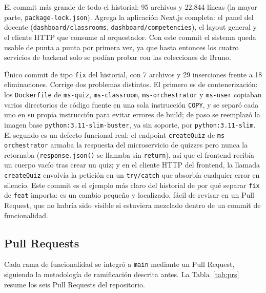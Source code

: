 \documentclass[12pt,a4paper]{article}
\begin{document}
\begin{description}[leftmargin=0pt,style=nextline,itemsep=8pt]
  \item[\texttt{9efe0b5} --- \texttt{feat(frontend): add web application and core features}]
  El commit más grande de todo el historial: 95 archivos y 22{,}844 líneas (la mayor parte,
  \texttt{package-lock.json}). Agrega la aplicación Next.js completa: el panel del docente
  (\texttt{dashboard/classrooms}, \texttt{dashboard/competencies}), el layout general y el cliente
  HTTP que consume al orquestador. Con este commit el sistema queda usable de punta a punta por
  primera vez, ya que hasta entonces los cuatro servicios de backend solo se podían probar con las
  colecciones de Bruno.

  \item[\texttt{3a3222b} --- \texttt{fix: stabilize service containers and return created quizzes}]
  Único commit de tipo \texttt{fix} del historial, con 7 archivos y 29 inserciones frente a 18
  eliminaciones. Corrige dos problemas distintos. El primero es de contenerización: los
  \texttt{Dockerfile} de \texttt{ms-quiz}, \texttt{ms-classroom}, \texttt{ms-orchestrator} y
  \texttt{ms-user} copiaban varios directorios de código fuente en una sola instrucción
  \texttt{COPY}, y se separó cada uno en su propia instrucción para evitar errores de build; de
  paso se reemplazó la imagen base \texttt{python:3.11-slim-buster}, ya sin soporte, por
  \texttt{python:3.11-slim}. El segundo es un defecto funcional real: el endpoint
  \texttt{createQuiz} de \texttt{ms-orchestrator} armaba la respuesta del microservicio de quizzes
  pero nunca la retornaba (\texttt{response.json()} se llamaba sin \texttt{return}), así que el
  frontend recibía un cuerpo vacío tras crear un quiz; y en el cliente HTTP del frontend, la
  llamada \texttt{createQuiz} envolvía la petición en un \texttt{try/catch} que absorbía cualquier
  error en silencio. Este commit es el ejemplo más claro del historial de por qué separar
  \texttt{fix} de \texttt{feat} importa: es un cambio pequeño y localizado, fácil de revisar en un
  Pull Request, que no habría sido visible si estuviera mezclado dentro de un commit de
  funcionalidad.

\end{description}

\subsection{Pull Requests}

Cada rama de funcionalidad se integró a \texttt{main} mediante un Pull Request, siguiendo la
metodología de ramificación descrita antes. La Tabla~\ref{tab:prs} resume los seis Pull Requests
del repositorio.
\end{document}
